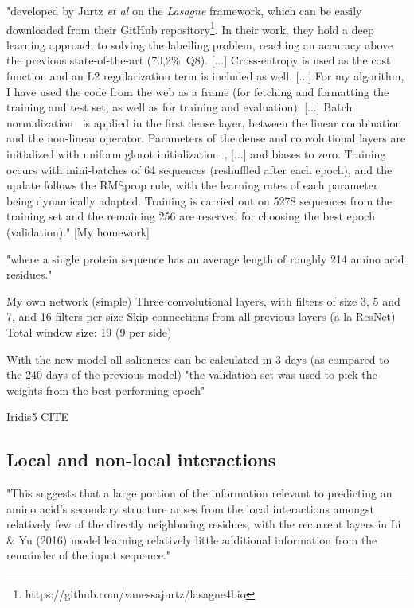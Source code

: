"developed by Jurtz \textit{et al} \cite{Jurtz2017} on the \textit{Lasagne} framework, which can be easily downloaded from their GitHub repository\footnote{https://github.com/vanessajurtz/lasagne4bio}. In their work, they hold a deep learning approach to solving the labelling problem, reaching an accuracy above the previous state-of-the-art (70,2\%~Q8).
[...]
Cross-entropy is used as the cost function and an L2 regularization term is included as well.
[...]
For my algorithm, I have used the code from the web as a frame (for fetching and formatting the training and test set, as well as for training and evaluation).
[...]
Batch normalization~\cite{Ioffe2015} is applied in the first dense layer, between the linear combination and the non-linear operator. Parameters of the dense and convolutional layers are initialized with uniform glorot initialization~\cite{Glorot2010}, [...] and biases to zero. Training occurs with mini-batches of 64 sequences (reshuffled after each epoch), and the update follows the RMSprop rule, with the learning rates of each parameter being dynamically adapted. Training is carried out on 5278 sequences from the training set and the remaining 256 are reserved for choosing the best epoch (validation)." [My homework]

"where a single protein sequence has an average length of roughly 214 amino acid residues." \cite{Busia2017}

My own network (simple)
Three convolutional layers, with filters of size 3, 5 and 7, and 16 filters per size
Skip connections from all previous layers (a la ResNet)
Total window size: 19 (9 per side)

With the new model all saliencies can be calculated in 3 days (as compared to the 240 days of the previous model)
"the validation set was used to pick the weights from the best performing epoch" \cite{Jurtz2017}

Iridis5 CITE

\subsection{Local and non-local interactions}
"This suggests that a large portion of the information relevant to predicting an amino acid’s secondary structure arises from the local interactions amongst relatively few of the directly neighboring residues, with the recurrent layers in Li \& Yu (2016) model learning relatively little additional information from the remainder of the input sequence." \cite{Busia2017}

